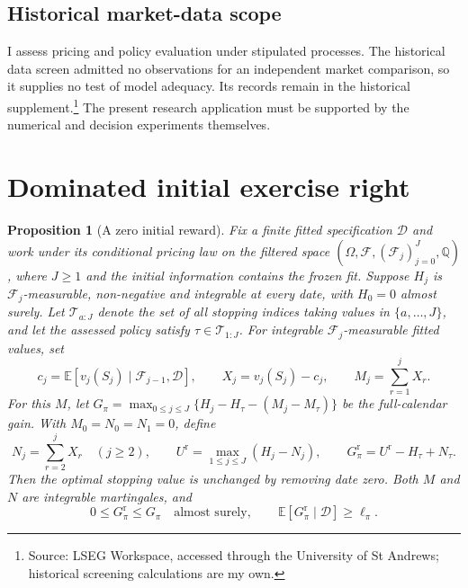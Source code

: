 \documentclass[11pt]{article}
\newtheorem{proposition}{Proposition}
\newcommand{\E}{\mathbb E}
\newcommand{\Q}{\mathbb Q}
\newcommand{\F}{\mathcal F}
\begin{document}
\subsection{Historical market-data scope}
\label{app:historical-scope}

I assess pricing and policy evaluation under stipulated processes. The historical data screen admitted no observations for an independent market comparison, so it supplies no test of model adequacy. Its records remain in the historical supplement.\footnote{Source: LSEG Workspace, accessed through the University of St Andrews; historical screening calculations are my own.} The present research application must be supported by the numerical and decision experiments themselves.
\section{Dominated initial exercise right}
\label{app:restricted-right}

\begin{proposition}[A zero initial reward]
\label{prop:restricted-right}
Fix a finite fitted specification $\mathcal D$ and work under its conditional pricing law on the filtered space $(\Omega,\F,(\F_j)_{j=0}^J,\Q)$, where $J\geq1$ and the initial information contains the frozen fit. Suppose $H_j$ is $\F_j$-measurable, non-negative and integrable at every date, with $H_0=0$ almost surely. Let $\mathcal T_{a:J}$ denote the set of all stopping indices taking values in $\{a,\ldots,J\}$, and let the assessed policy satisfy $\tau\in\mathcal T_{1:J}$. For integrable $\F_j$-measurable fitted values, set
\begin{equation}
 c_j=\E[v_j(S_j)\mid\F_{j-1},\mathcal D],\qquad
 X_j=v_j(S_j)-c_j,\qquad M_j=\sum_{r=1}^jX_r.
\end{equation}
For this $M$, let $G_\pi=\max_{0\leq j\leq J}\{H_j-H_\tau-(M_j-M_\tau)\}$ be the full-calendar gain. With $M_0=N_0=N_1=0$, define
\begin{equation}
 N_j=\sum_{r=2}^{j}X_r\quad(j\geq2),\qquad
 U^{\mathrm r}=\max_{1\leq j\leq J}(H_j-N_j),\qquad
 G^{\mathrm r}_\pi=U^{\mathrm r}-H_\tau+N_\tau.
\end{equation}
Then the optimal stopping value is unchanged by removing date zero. Both $M$ and $N$ are integrable martingales, and
\begin{equation}
 0\leq G^{\mathrm r}_\pi\leq G_\pi\quad\text{almost surely},\qquad
 \E[G^{\mathrm r}_\pi\mid\mathcal D]\geq\ell_\pi.
\end{equation}
\end{proposition}
\end{document}
